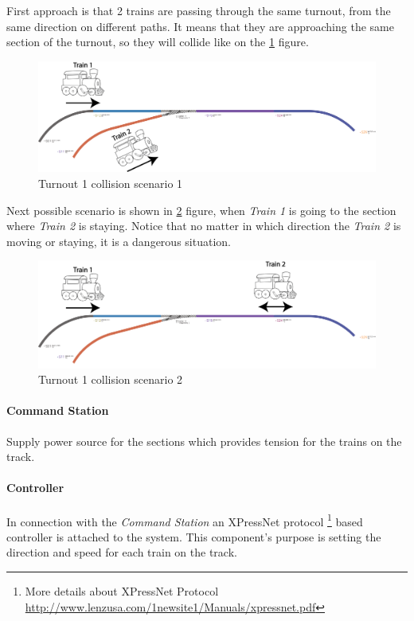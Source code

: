 First approach is that 2 trains are passing through the same turnout, from the same direction on different paths. It means that they are approaching the same section of the turnout, so they will collide like on the \ref{fig:LayoutT1-scenario1} figure.
\begin{figure}[!h]
	\centering
	\includegraphics[width=150mm, keepaspectratio]{figures/modes3/layoutT1-scenario1.png}
	\caption{Turnout 1 collision scenario 1}
	\label{fig:LayoutT1-scenario1}
\end{figure}

Next possible scenario is shown in \ref{fig:LayoutT1-scenario2} figure, when \textit{Train 1} is going to the section where \textit{Train 2} is staying. Notice that no matter in which direction the \textit{Train 2} is moving or staying, it is a dangerous situation.
\begin{figure}[!h]
	\centering
	\includegraphics[width=150mm, keepaspectratio]{figures/modes3/layoutT1-scenario2.png}
	\caption{Turnout 1 collision scenario 2}
	\label{fig:LayoutT1-scenario2}
\end{figure}

\paragraph{Command Station} \label{basics:CS}
Supply power source for the sections which provides tension for the trains on the track.

\paragraph{Controller}
In connection with the \textit{Command Station} an XPressNet protocol \footnote{More details about XPressNet Protocol \url{http://www.lenzusa.com/1newsite1/Manuals/xpressnet.pdf}} based controller is attached to the system. This component's purpose is setting the direction and speed for each train on the track.

